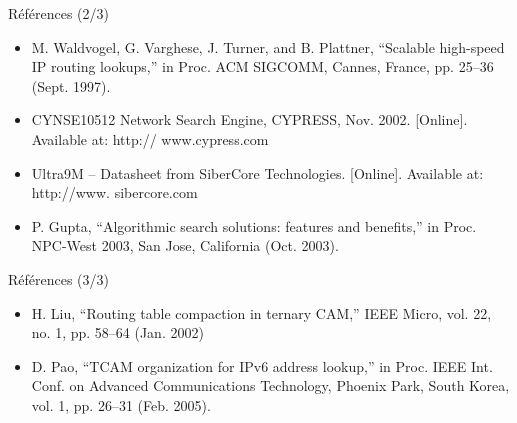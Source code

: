 \documentclass{beamer}
\begin{document}
\begin{frame}{Références (2/3)}
\begin{itemize}

\item M. Waldvogel, G. Varghese, J. Turner, and B. Plattner, “Scalable high-speed IP routing lookups,”
in Proc. ACM SIGCOMM, Cannes, France, pp. 25–36 (Sept. 1997).
\item CYNSE10512 Network Search Engine, CYPRESS, Nov. 2002. [Online]. Available at: http://
www.cypress.com
\item Ultra9M – Datasheet from SiberCore Technologies. [Online]. Available at: http://www.
sibercore.com
\item P. Gupta, “Algorithmic search solutions: features and benefits,” in Proc. NPC-West 2003,
San Jose, California (Oct. 2003).

\end{itemize}
\end{frame}

\begin{frame}{Références (3/3)}
\begin{itemize}

\item H. Liu, “Routing table compaction in ternary CAM,” IEEE Micro, vol. 22, no. 1, pp. 58–64
(Jan. 2002)
\item D. Pao, “TCAM organization for IPv6 address lookup,” in Proc. IEEE Int. Conf. on Advanced 
Communications Technology, Phoenix Park, South Korea, vol. 1, pp. 26–31 (Feb. 2005).

\end{itemize}
\end{frame}
\end{document}

